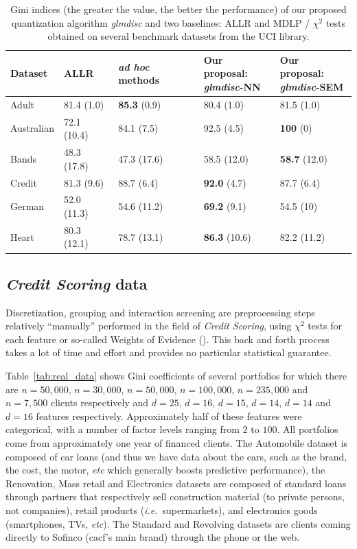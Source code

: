 \begin{table}
    \centering
        \caption{Gini indices (the greater the value, the better the performance) of our proposed quantization algorithm \textit{glmdisc} and two baselines: ALLR and MDLP / $\chi^2$ tests obtained on several benchmark datasets from the UCI library.}
    \label{tab:banchmark}
\begin{small}
\begin{tabular}{lllll}
Dataset & ALLR & \textit{ad hoc} methods & \makecell{Our proposal:\\ \textit{glmdisc}-NN} & \makecell{Our proposal:\\ \textit{glmdisc}-SEM} \\
\hline
Adult & 81.4 (1.0) & \textbf{85.3} (0.9) & 80.4 (1.0) & 81.5 (1.0) \\
Australian & 72.1 (10.4) & 84.1 (7.5) & 92.5 (4.5) & \textbf{100} (0) \\
Bands & 48.3 (17.8) & 47.3 (17.6) & 58.5 (12.0) & \textbf{58.7} (12.0) \\
Credit & 81.3 (9.6) & 88.7 (6.4) & \textbf{92.0} (4.7) & 87.7 (6.4) \\
German & 52.0 (11.3) & 54.6 (11.2) & \textbf{69.2} (9.1) & 54.5 (10) \\
Heart & 80.3 (12.1) & 78.7 (13.1) & \textbf{86.3} (10.6) & 82.2 (11.2) 
\end{tabular}
\end{small}
\end{table}

\subsection{\textit{Credit Scoring} data} \label{subsec:exp_real}


Discretization, grouping and interaction screening are preprocessing steps relatively ``manually'' performed in the field of \textit{Credit Scoring}, using $\chi^2$ tests for each feature or so-called Weights of Evidence (\cite{zeng2014necessary}). This back and forth process takes a lot of time and effort and provides no particular statistical guarantee.

Table~\ref{tab:real_data} shows Gini coefficients of several portfolios for which there are $n=50,000$, $n=30,000$, $n=50,000$, $n=100,000$, $n=235,000$ and $n=7,500$ clients respectively and $d=25$, $d=16$, $d=15$, $d=14$, $d=14$ and $d=16$ features respectively. Approximately half of these features were categorical, with a number of factor levels ranging from $2$ to $100$. All portfolios come from approximately one year of financed clients. The Automobile dataset is composed of car loans (and thus we have data about the cars, such as the brand, the cost, the motor, \textit{etc} which generally boosts predictive performance), the Renovation, Mass retail and Electronics datasets are composed of standard loans through partners that respectively sell construction material (to private persons, not companies), retail products (\textit{i.e.}\ supermarkets), and electronics goods (smartphones, TVs, \textit{etc}). The Standard and Revolving datasets are clients coming directly to Sofinco (\gls{cacf}'s main brand) through the phone or the web.


